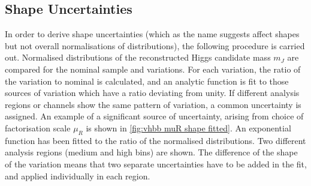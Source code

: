 \subsection{Shape Uncertainties}

In order to derive shape uncertainties (which as the name suggests affect shapes but not overall normalisations of distributions), the following procedure is carried out. Normalised distributions of the reconstructed Higgs candidate mass $m_J$ are compared for the nominal sample and variations. For each variation, the ratio of the variation to nominal is calculated, and an analytic function is fit to those sources of variation which have a ratio deviating from unity. If different analysis regions or channels show the same pattern of variation, a common uncertainty is assigned. An example of a significant source of uncertainty, arising from choice of factorisation scale $\mu_R$ is shown in \cref{fig:vhbb muR shape fitted}. An exponential function has been fitted to the ratio of the normalised distributions. Two different analysis regions (medium and high \pTV bins) are shown. The difference of the shape of the variation means that two separate uncertainties have to be added in the fit, and applied individually in each \pTV region. 
%
